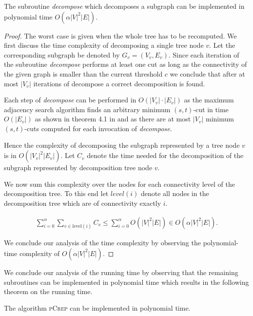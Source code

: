 \documentclass[a4paper,UKenglish,cleveref, autoref, thm-restate,authorcolumns]{lipics-v2019}
\newcommand{\adjDel}{\textsc{pCrep}}
\begin{document}
\begin{lemma}
	\label{dec_run_time_lem}
	The subroutine \textit{decompose} which decomposes a subgraph can be implemented in polynomial time $O(\alpha|V|^2|E|)$.
\end{lemma}

\begin{proof}
	The worst case is given when the whole tree has to be recomputed. We first discuss the time complexity of decomposing a single tree node $v$. Let the corresponding subgraph be denoted by $G_v=(V_v, E_v)$.
	Since each iteration of the subroutine \textit{decompose} performs at least one cut as long as the connectivity of the given graph is smaller than the current threshold $c$ we conclude that after at most $|V_v|$ iterations of decompose a correct decomposition is found. 
	
	Each step of \textit{decompose} can be performed in $O(|V_v|\cdot|E_v|)$ as the maximum adjacency search algorithm finds an arbitrary minimum $(s,t)$-cut in time $O(|E_v|)$ as shown in theorem 4.1 in \cite{Chang2013} and as there are at most $|V_v|$ minimum $(s,t)$-cuts computed for each invocation of \textit{decompose}.
	
	Hence the complexity of decomposing the subgraph represented by a tree node $v$ is in $O(|V_v|^2|E_v|)$. Let $C_v$ denote the time needed for the decomposition of the subgraph represented  by decomposition tree node $v$.
	
	We now sum this complexity over the nodes for each connectivity level of the decomposition tree. To this end let $level(i)$ denote all nodes in the decomposition tree which are of connectivity exactly $i$.
	
	\begin{align*}
	\sum_{i=0}^{\alpha}\sum_{v\in \text{level}(i)}C_v\leq\sum_{i=0}^{\alpha}O(|V|^2|E|)\in O(\alpha|V|^2|E|).
	\end{align*}
	
	We conclude our analysis of the time complexity by observing the polynomial-time complexity of $O(\alpha|V|^2|E|)$.
\end{proof}


We conclude our analysis of the running time by observing that the remaining subroutines can be implemented in polynomial time which results in the following theorem on the running time.

\begin{theorem}
	\label{run_time_theo}
	The algorithm \adjDel{} can be implemented in polynomial time.
\end{theorem}
\end{document}
